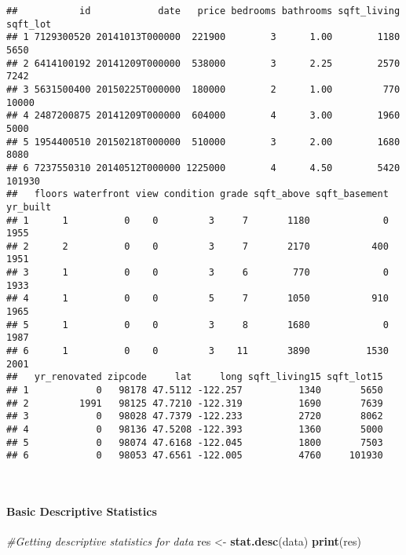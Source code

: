 \documentclass[
]{article}
\newenvironment{Shaded}{\begin{snugshade}}{\end{snugshade}}
\newcommand{\CommentTok}[1]{\textcolor[rgb]{0.56,0.35,0.01}{\textit{#1}}}
\newcommand{\KeywordTok}[1]{\textcolor[rgb]{0.13,0.29,0.53}{\textbf{#1}}}
\newcommand{\NormalTok}[1]{#1}
\newcommand{\StringTok}[1]{\textcolor[rgb]{0.31,0.60,0.02}{#1}}
\begin{document}
\begin{verbatim}
##           id            date   price bedrooms bathrooms sqft_living sqft_lot
## 1 7129300520 20141013T000000  221900        3      1.00        1180     5650
## 2 6414100192 20141209T000000  538000        3      2.25        2570     7242
## 3 5631500400 20150225T000000  180000        2      1.00         770    10000
## 4 2487200875 20141209T000000  604000        4      3.00        1960     5000
## 5 1954400510 20150218T000000  510000        3      2.00        1680     8080
## 6 7237550310 20140512T000000 1225000        4      4.50        5420   101930
##   floors waterfront view condition grade sqft_above sqft_basement yr_built
## 1      1          0    0         3     7       1180             0     1955
## 2      2          0    0         3     7       2170           400     1951
## 3      1          0    0         3     6        770             0     1933
## 4      1          0    0         5     7       1050           910     1965
## 5      1          0    0         3     8       1680             0     1987
## 6      1          0    0         3    11       3890          1530     2001
##   yr_renovated zipcode     lat     long sqft_living15 sqft_lot15
## 1            0   98178 47.5112 -122.257          1340       5650
## 2         1991   98125 47.7210 -122.319          1690       7639
## 3            0   98028 47.7379 -122.233          2720       8062
## 4            0   98136 47.5208 -122.393          1360       5000
## 5            0   98074 47.6168 -122.045          1800       7503
## 6            0   98053 47.6561 -122.005          4760     101930
\end{verbatim}

~

\hypertarget{basic-descriptive-statistics}{%
\paragraph{Basic Descriptive
Statistics}\label{basic-descriptive-statistics}}

\begin{Shaded}
\begin{Highlighting}[]
\CommentTok{#Getting descriptive statistics for data}
\NormalTok{res <-}\StringTok{ }\KeywordTok{stat.desc}\NormalTok{(data)}
\KeywordTok{print}\NormalTok{(res)}
\end{Highlighting}
\end{Shaded}
\end{document}
